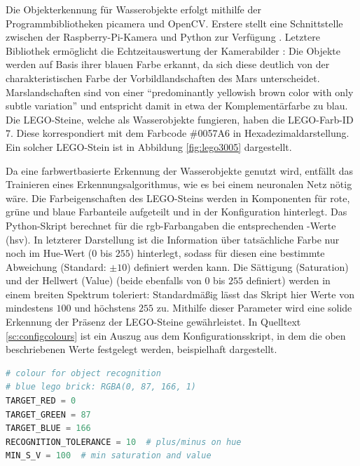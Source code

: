 Die Objekterkennung für Wasserobjekte erfolgt mithilfe der Programmbibliotheken picamera und OpenCV.
Erstere stellt eine Schnittstelle zwischen der Raspberry-Pi-Kamera und Python zur Verfügung \cite{cox2014}.
Letztere Bibliothek ermöglicht die Echtzeitauswertung der Kamerabilder \cite{pajankar2015}:
Die Objekte werden auf Basis ihrer blauen Farbe erkannt, da sich diese deutlich von der charakteristischen Farbe der Vorbildlandschaften des Mars unterscheidet.
Marslandschaften sind von einer \enquote{predominantly yellowish brown color with only subtle variation} \cite[S. 1]{maki1999} und entspricht damit in etwa der Komplementärfarbe zu blau.
Die LEGO-Steine, welche als Wasserobjekte fungieren, haben die LEGO-Farb-ID $7$.
Diese korrespondiert mit dem Farbcode \#0057A6 in Hexadezimaldarstellung.
Ein solcher LEGO-Stein ist in Abbildung \ref{fig:lego3005} dargestellt.

Da eine farbwertbasierte Erkennung der Wasserobjekte genutzt wird, entfällt das Trainieren eines Erkennungsalgorithmus, wie es bei einem neuronalen Netz nötig wäre.
Die Farbeigenschaften des LEGO-Steins werden in Komponenten für rote, grüne und blaue Farbanteile aufgeteilt und in der Konfiguration hinterlegt.
Das Python-Skript berechnet für die \acs{rgb}-Farbangaben die entsprechenden -Werte (\acl{hsv}).
In letzterer Darstellung ist die Information über tatsächliche Farbe nur noch im Hue-Wert ($0$ bis $255$) hinterlegt, sodass für diesen eine bestimmte Abweichung (Standard: $\pm 10$) definiert werden kann.
Die Sättigung (Saturation) und der Hellwert (Value) (beide ebenfalls von $0$ bis $255$ definiert) werden in einem breiten Spektrum toleriert:
Standardmäßig lässt das Skript hier Werte von mindestens $100$ und höchstens $255$ zu.
Mithilfe dieser Parameter wird eine solide Erkennung der Präsenz der LEGO-Steine gewährleistet.
In Quelltext \ref{sc:configcolours} ist ein Auszug aus dem Konfigurationsskript, in dem die oben beschriebenen Werte festgelegt werden, beispielhaft dargestellt.

\begin{lstlisting}[caption={Auszug aus der Konfiguration mit Standardwerten für die farbbasierte Objekterkennung}, label={sc:configcolours}, numbers=none, language={Python}, float, abovecaptionskip=1em]
# colour for object recognition
# blue lego brick: RGBA(0, 87, 166, 1)
TARGET_RED = 0
TARGET_GREEN = 87
TARGET_BLUE = 166
RECOGNITION_TOLERANCE = 10  # plus/minus on hue
MIN_S_V = 100  # min saturation and value
\end{lstlisting}

